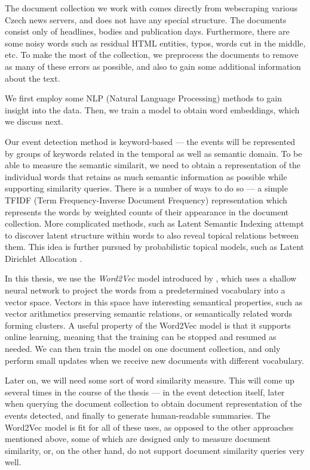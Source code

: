 The document collection we work with comes directly from webscraping various Czech news servers, and does not have any special structure. The documents consist only of headlines, bodies and publication days. Furthermore, there are some noisy words such as residual HTML entities, typos, words cut in the middle, etc. To make the most of the collection, we preprocess the documents to remove as many of these errors as possible, and also to gain some additional information about the text.

We first employ some NLP (Natural Language Processing) methods to gain insight into the data. Then, we train a model to obtain word embeddings, which we discuss next.

Our event detection method is keyword-based --- the events will be represented by groups of keywords related in the temporal as well as semantic domain. To be able to measure the semantic similarit, we need to obtain a representation of the individual words that retains as much semantic information as possible while supporting similarity queries. There is a number of ways to do so --- a simple TFIDF (Term Frequency-Inverse Document Frequency) representation \citep{tfidf, information-retrieval} which represents the words by weighted counts of their appearance in the document collection. More complicated methods, such as Latent Semantic Indexing \citep{lsi} attempt to discover latent structure within words to also reveal topical relations between them. This idea is further pursued by probabilistic topical models, such as Latent Dirichlet Allocation \citep{lda}.

In this thesis, we use the \textit{Word2Vec} model introduced by \cite{word2vec, distributed-representations, linguistic-regularities}, which uses a shallow neural network to project the words from a predetermined vocabulary into a vector space. Vectors in this space have interesting semantical properties, such as vector arithmetics preserving semantic relations, or semantically related words forming clusters. A useful property of the Word2Vec model is that it supports online learning, meaning that the training can be stopped and resumed as needed. We can then train the model on one document collection, and only perform small updates when we receive new documents with different vocabulary.

Later on, we will need some sort of word similarity measure. This will come up several times in the course of the thesis --- in the event detection itself, later when querying the document collection to obtain document representation of the events detected, and finally to generate human-readable summaries. The Word2Vec model is fit for all of these uses, as opposed to the other approaches mentioned above, some of which are designed only to measure document similarity, or, on the other hand, do not support document similarity queries very well.


